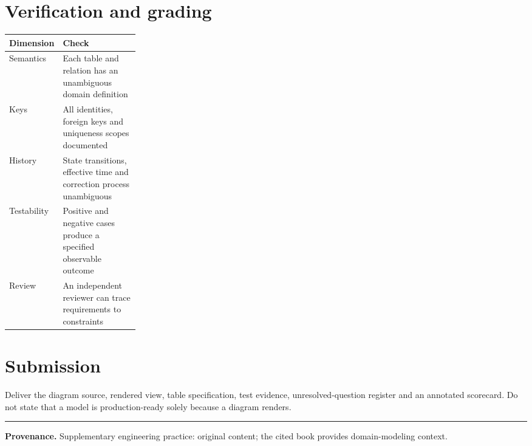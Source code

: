 \documentclass[11pt,letterpaper]{article}
\begin{document}
\section{Verification and grading}
\begin{tabularx}{\linewidth}{@{}>{\raggedright\arraybackslash}p{0.25\linewidth}>{\raggedright\arraybackslash}X@{}}
\toprule
\textbf{Dimension} & \textbf{Check} \\ 
\midrule
Semantics & Each table and relation has an unambiguous domain definition \\ 
Keys & All identities, foreign keys and uniqueness scopes documented \\ 
History & State transitions, effective time and correction process unambiguous \\ 
Testability & Positive and negative cases produce a specified observable outcome \\ 
Review & An independent reviewer can trace requirements to constraints \\ 
\bottomrule
\end{tabularx}

\section{Submission}
Deliver the diagram source, rendered view, table specification, test evidence, unresolved-question register and an annotated scorecard. Do not state that a model is production-ready solely because a diagram renders.


\vfill
\hrule
{\footnotesize\textbf{Provenance.} Supplementary engineering practice: original content; the cited book provides domain-modeling context.}
\end{document}
